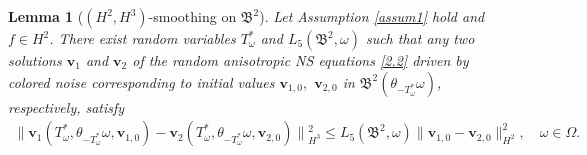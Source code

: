 \documentclass{elsarticle}
\newtheorem{lemma}[theorem]{Lemma}
\theoremstyle{definition}
\numberwithin{equation}{section}
\begin{document}
\begin{lemma}[$(H^2, H^3)$-smoothing on $\mathfrak B^2$]\label{lemma7.3} Let Assumption \ref{assum1} hold and $f\in H^2$. There  exist  random variables $T_\omega^*$ and $ L_5(\mathfrak B^2, \omega )$ such that   any two solutions $\textbf{v}_1$ and $\textbf{v}_2$ of the random anisotropic  NS equations \eqref{2.2} driven by colored noise corresponding to initial values  $\textbf{v}_{1,0},$ $\textbf{v}_{2,0}$ in $\mathfrak{B}^2(\theta_{-T_\omega^*}\omega)$, respectively,   satisfy
\begin{align*}
 \big \|\textbf{v}_1(T_\omega^*,\theta_{-T_\omega^*}\omega,\textbf{v}_{1,0})-\textbf{v}_2(T_\omega^*,\theta_{-T_\omega^*}\omega,
 \textbf{v}_{2,0}) \big \|{^2_{H^3}}\leq  L_5(\mathfrak B^2, \omega)\|\textbf{v}_{1,0}-\textbf{v}_{2,0}\|^2_{H^2}, \quad \omega\in \Omega.
\end{align*}
\end{lemma}
\end{document}
